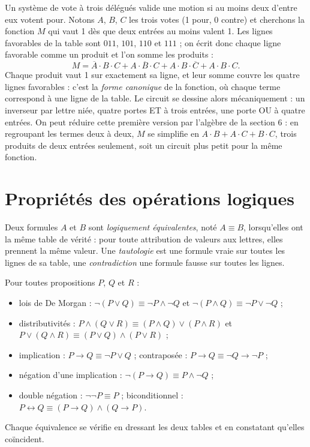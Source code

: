 \begin{exemple}
Un système de vote à trois délégués valide une motion si au moins deux d'entre eux votent pour. Notons $A$, $B$, $C$ les trois votes (1 pour, 0 contre) et cherchons la fonction $M$ qui vaut 1 dès que deux entrées au moins valent 1. Les lignes favorables de la table sont $011$, $101$, $110$ et $111$ ; on écrit donc chaque ligne favorable comme un produit et l'on somme les produits :
\[
M = \overline{A} \cdot B \cdot C + A \cdot \overline{B} \cdot C + A \cdot B \cdot \overline{C} + A \cdot B \cdot C .
\]
Chaque produit vaut 1 sur exactement sa ligne, et leur somme couvre les quatre lignes favorables : c'est la \emph{forme canonique} de la fonction, où chaque terme correspond à une ligne de la table. Le circuit se dessine alors mécaniquement : un inverseur par lettre niée, quatre portes ET à trois entrées, une porte OU à quatre entrées. On peut réduire cette première version par l'algèbre de la section 6 : en regroupant les termes deux à deux, $M$ se simplifie en $A \cdot B + A \cdot C + B \cdot C$, trois produits de deux entrées seulement, soit un circuit plus petit pour la même fonction.
\end{exemple}

\section{Propriétés des opérations logiques}

\begin{definition}
Deux formules $A$ et $B$ sont \emph{logiquement équivalentes}, noté $A \equiv B$, lorsqu'elles ont la même table de vérité : pour toute attribution de valeurs aux lettres, elles prennent la même valeur. Une \emph{tautologie} est une formule vraie sur toutes les lignes de sa table, une \emph{contradiction} une formule fausse sur toutes les lignes.
\end{definition}

\begin{propriete}
Pour toutes propositions $P$, $Q$ et $R$ :
\begin{itemize}
  \item lois de De Morgan : $\lnot(P \lor Q) \equiv \lnot P \land \lnot Q$ \quad et \quad $\lnot(P \land Q) \equiv \lnot P \lor \lnot Q$ ;
  \item distributivités : $P \land (Q \lor R) \equiv (P \land Q) \lor (P \land R)$ \quad et \quad $P \lor (Q \land R) \equiv (P \lor Q) \land (P \lor R)$ ;
  \item implication : $P \rightarrow Q \equiv \lnot P \lor Q$ ; contraposée : $P \rightarrow Q \equiv \lnot Q \rightarrow \lnot P$ ;
  \item négation d'une implication : $\lnot(P \rightarrow Q) \equiv P \land \lnot Q$ ;
  \item double négation : $\lnot\lnot P \equiv P$ ; biconditionnel : $P \leftrightarrow Q \equiv (P \rightarrow Q) \land (Q \rightarrow P)$.
\end{itemize}
Chaque équivalence se vérifie en dressant les deux tables et en constatant qu'elles coïncident.
\end{propriete}

